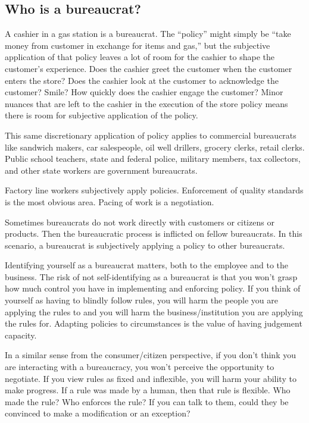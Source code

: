 \subsection{Who is a bureaucrat?}

A cashier in a gas station is a bureaucrat. The ``policy'' might simply be ``take money from customer in exchange for items and gas,'' but the subjective application of that policy leaves a lot of room for the cashier to shape the customer's experience. Does the cashier greet the customer when the customer enters the store? Does the cashier look at the customer to acknowledge the customer? Smile? How quickly does the cashier engage the customer? Minor nuances that are left to the cashier in the execution of the store policy means there is room for subjective application of the policy. 

This same discretionary application of policy applies to commercial bureaucrats like sandwich makers, car salespeople, oil well drillers, grocery clerks, retail clerks. Public school teachers, state and federal police, military members, tax collectors, and other state workers are government bureaucrats. 

Factory line workers subjectively apply policies. Enforcement of quality standards is the most obvious area. Pacing of work is a negotiation.

Sometimes bureaucrats do not work directly with customers or citizens or products. Then the bureaucratic process is inflicted on fellow bureaucrats. In this scenario, a bureaucrat is subjectively applying a policy to other bureaucrats. 

Identifying yourself as a bureaucrat matters, both to the employee and to the business. The risk of not self-identifying as a bureaucrat is that you won't grasp how much control you have in implementing and enforcing policy. If you think of yourself as having to blindly follow rules, you will harm the people you are applying the rules to and you will harm the business/institution you are applying the rules for. Adapting policies to circumstances is the value of having judgement capacity. 

In a similar sense from the consumer/citizen perspective, if you don't think you are interacting with a bureaucracy, you won't perceive the opportunity to negotiate.  If you view rules as fixed and inflexible, you will harm your ability to make progress. If a rule was made by a human, then that rule is flexible. Who made the rule? Who enforces the rule? If you can talk to them, could they be convinced to make a modification or an exception?

